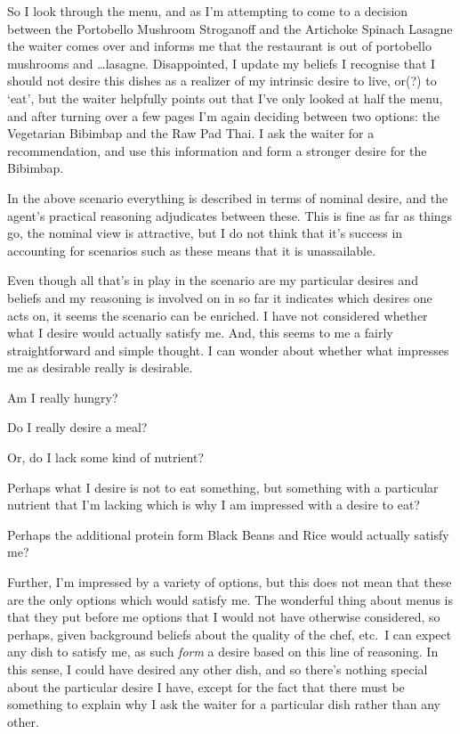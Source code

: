 \documentclass[10pt]{article}
\begin{document}
\begin{scenario}
  So I look through the menu, and as I'm attempting to come to a decision between the Portobello Mushroom Stroganoff and the Artichoke Spinach Lasagne the waiter comes over and informs me that the restaurant is out of portobello mushrooms and \dots lasagne. Disappointed, I update my beliefs I recognise that I should not desire this dishes as a realizer of my intrinsic desire to live, or(?) to `eat', but the waiter helpfully points out that I've only looked at half the menu, and after turning over a few pages I'm again deciding between two options: the Vegetarian Bibimbap and the Raw Pad Thai. I ask the waiter for a recommendation, and use this information and form a stronger desire for the Bibimbap.
\end{scenario}

In the above scenario everything is described in terms of nominal desire, and the agent's practical reasoning adjudicates between these.
This is fine as far as things go, the nominal view is attractive, but I do not think that it's success in accounting for scenarios such as these means that it is unassailable.

Even though all that's in play in the scenario are my particular desires and beliefs and my reasoning is involved on in so far it indicates which desires one acts on, it seems the scenario can be enriched.
I have not considered whether what I desire would actually satisfy me.
And, this seems to me a fairly straightforward and simple thought.
I can wonder about whether what impresses me as desirable really is desirable.
\begin{enumerate*}[label=\arabic*.]
\item Am I really hungry?
\item Do I really desire a meal?
\item Or, do I lack some kind of nutrient?
\item Perhaps what I desire is not to eat something, but something with a particular nutrient that I'm lacking which is why I am impressed with a desire to eat?
\item Perhaps the additional protein form Black Beans and Rice would actually satisfy me?
\end{enumerate*}

Further, I'm impressed by a variety of options, but this does not mean that these are the only options which would satisfy me.
The wonderful thing about menus is that they put before me options that I would not have otherwise considered, so perhaps, given background beliefs about the quality of the chef, etc.\ I can expect any dish to satisfy me, as such \emph{form} a desire based on this line of reasoning.
In this sense, I could have desired any other dish, and so there's nothing special about the particular desire I have, except for the fact that there must be something to explain why I ask the waiter for a particular dish rather than any other.
\end{document}
